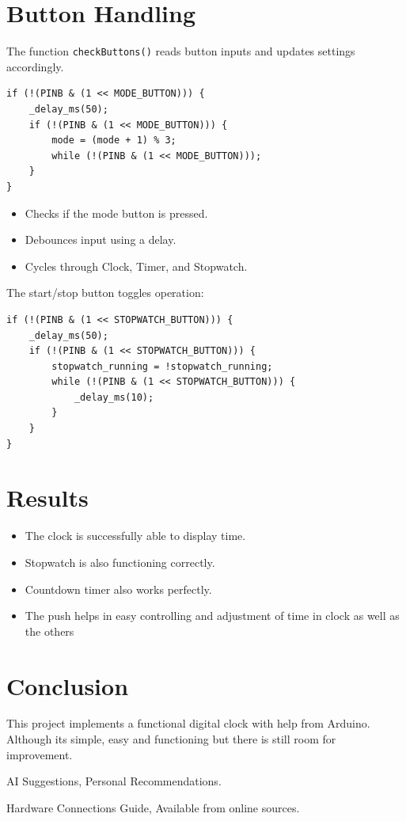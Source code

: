 \documentclass[a4paper,12pt]{article}
\begin{document}
\section*{Button Handling}
The function \texttt{checkButtons()} reads button inputs and updates settings accordingly.

\begin{lstlisting}
if (!(PINB & (1 << MODE_BUTTON))) {
    _delay_ms(50);
    if (!(PINB & (1 << MODE_BUTTON))) {
        mode = (mode + 1) % 3; 
        while (!(PINB & (1 << MODE_BUTTON)));
    }
}
\end{lstlisting}

\begin{itemize}
    \item Checks if the mode button is pressed.
    \item Debounces input using a delay.
    \item Cycles through Clock, Timer, and Stopwatch.
\end{itemize}

The start/stop button toggles operation:

\begin{lstlisting}
if (!(PINB & (1 << STOPWATCH_BUTTON))) {
    _delay_ms(50);
    if (!(PINB & (1 << STOPWATCH_BUTTON))) {
        stopwatch_running = !stopwatch_running;
        while (!(PINB & (1 << STOPWATCH_BUTTON))) {
            _delay_ms(10);
        }
    }
}
\end{lstlisting}

\section{Results}
\begin{itemize}
    \item The clock is successfully able to display time.
    \item Stopwatch is also functioning correctly.
    \item Countdown timer also works perfectly.
    \item The push helps in easy controlling and adjustment of time in clock as well as the others     
\end{itemize}

\section{Conclusion}
This project implements a functional digital clock with help from Arduino. Although its simple, easy and functioning but there is still room for improvement.

\begin{thebibliography}{9}

 AI Suggestions, Personal Recommendations.

 Hardware Connections Guide, Available from online sources.

\end{thebibliography}
\end{document}
